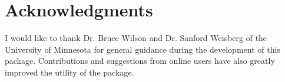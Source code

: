 \documentclass[article,shortnames]{jss}\usepackage[]{graphicx}\usepackage[]{color}
\begin{document}
\section[Acknowledgments]{Acknowledgments}
 
I would like to thank Dr. Bruce Wilson and Dr. Sanford Weisberg of the University of Minnesota for general guidance during the development of this package.  Contributions and suggestions from online users have also greatly improved the utility of the package.    



\end{document}
